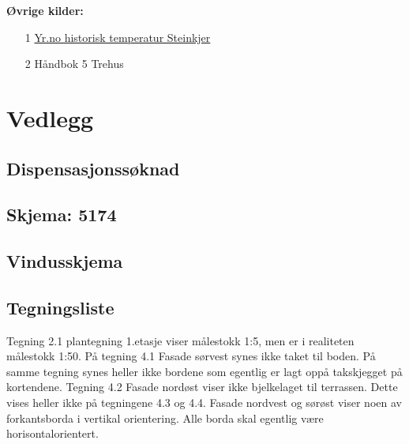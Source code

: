 \documentclass[12pt]{article}
\begin{document}
\textbf{Øvrige kilder:}
\begin{itemize}
	\item[1]\href{https://www.yr.no/nb/historikk/graf/1-2296935/Norge/Tr\%C3\%B8ndelag/Steinkjer/Steinkjer?q=2018}{Yr.no historisk temperatur Steinkjer}
	\item[2] Håndbok 5 Trehus 
\end{itemize}


\pagebreak
\section{Vedlegg}


\subsection{Dispensasjonssøknad}


\pagebreak
\subsection{Skjema: 5174}


\pagebreak
\subsection{Vindusskjema}



\pagebreak
\subsection{Tegningsliste}
Tegning 2.1 plantegning 1.etasje viser målestokk 1:5, men er i realiteten målestokk 1:50.
På tegning 4.1 Fasade sørvest synes ikke taket til boden. På samme tegning synes heller ikke bordene som egentlig er lagt oppå takskjegget på kortendene.
Tegning 4.2 Fasade nordøst viser ikke bjelkelaget til terrassen. Dette vises heller ikke på tegningene 4.3 og 4.4.
Fasade nordvest og sørøst viser noen av forkantsborda i vertikal orientering. Alle borda skal egentlig være horisontalorientert.









	
	
	
	
	
	
	
	
\end{document}

